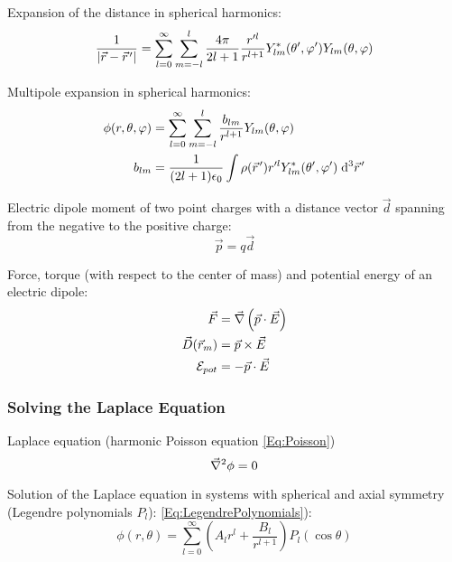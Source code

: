 			\noindent
			Expansion of the distance in spherical harmonics:
			\begin{equation}
				\frac{1}{\left|\vec{r}-\pvec{r}'\right|}=\sum_{l=0}^{\infty}\sum_{m=-l}^{l} \frac{4\pi}{2l+1}\frac{r'^l}{r^{l+1}} Y^{*}_{lm}(\theta',\varphi')Y_{lm}(\theta,\varphi)
			\end{equation}

			\noindent
			Multipole expansion in spherical harmonics:
			\begin{equation}
				\begin{aligned}
					\phi(r,\theta,\varphi) &= \sum_{l=0}^{\infty}\sum_{m=-l}^{l} \frac{b_{lm}}{r^{l+1}}Y_{lm}(\theta,\varphi) \\
					b_{lm} &= \frac{1}{(2l+1)\epsilon_0}\int\rho(\pvec{r}')r'^lY^{*}_{lm}(\theta',\varphi')\;\dd^3\pvec{r}'
				\end{aligned}
			\end{equation}

			\noindent
			Electric dipole moment of two point charges with a distance vector $\vec{d}$ spanning from the negative to the positive charge:
			\begin{equation}
				\vec{p}=q\vec{d}
			\end{equation}

			\noindent
			Force, torque (with respect to the center of mass) and potential energy of an electric dipole:
			\begin{equation}
				\begin{aligned}
					\vec{F} &= \vec{\nabla}\left(\vec{p}\cdot\vec{E}\right) \\
					\vec{D}(\vec{r}_m) &= \vec{p}\times\vec{E} \\
					\mathcal{E}_{pot} &= -\vec{p}\cdot\vec{E} \\
				\end{aligned}
			\end{equation}

		\subsubsection{Solving the Laplace Equation}
			\noindent
			Laplace equation (harmonic Poisson equation \ref{Eq:Poisson})
			\begin{equation}
				\vec{\nabla}^2 \phi = 0
			\end{equation}

			\noindent
			Solution of the Laplace equation in systems with spherical and axial symmetry (Legendre polynomials $P_l$): \ref{Eq:LegendrePolynomials}):
			\begin{equation}
				\phi(r,\theta)=\sum_{l=0}^\infty \left(A_l r^l + \frac{B_l}{r^{l+1}}\right)P_l(\cos\theta)
			\end{equation}

